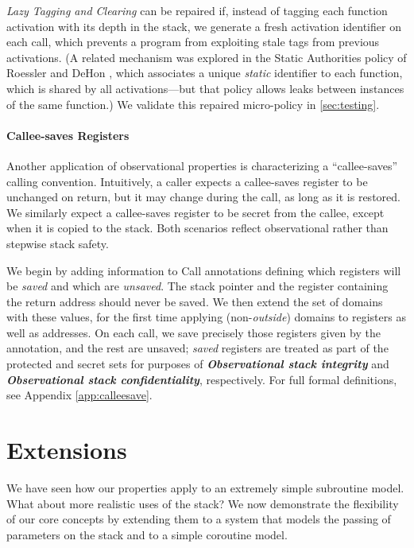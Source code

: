 \documentclass[10pt,conference]{ieeetran}%
\theoremstyle{definition}
\begin{document}
{{\em Lazy Tagging and Clearing} can be repaired if, instead of tagging each function
activation with its depth in the stack, we generate a fresh activation
identifier on each call, which prevents a program from exploiting stale
tags from previous activations.
(A related mechanism was explored in the
Static Authorities policy of Roessler and DeHon \cite{DBLP:conf/sp/RoesslerD18}, which
associates a unique \emph{static} identifier to each function, which is shared
by all activations---but that policy allows leaks between
instances of the same function.) We validate this repaired micro-policy in
\ref{sec:testing}.

\medskip
\paragraph*{Callee-saves Registers}
\label{sec:callee}

Another application of observational properties is characterizing a ``callee-saves''
calling convention. Intuitively, a caller expects a callee-saves register to be unchanged on
return, but it may change during the call, as long as it is restored. We similarly expect a callee-saves
register to be secret from the callee, except when it is copied to the stack. Both scenarios
reflect observational rather than stepwise stack safety.

We begin by adding information to Call annotations defining which registers will be {\em saved}
and which are {\em unsaved}. The stack pointer and the register containing the return address
should never be saved. We then extend the set of domains with these values, for the first time applying
(non-{\em outside}) domains to registers as well as addresses. On each call, we save precisely those
registers given by the annotation, and the rest are unsaved; {\em saved} registers are treated as part
of the protected and secret sets for purposes of \textbf{\em Observational stack integrity} and
\textbf{\em Observational stack confidentiality}, respectively. For full formal definitions, see
Appendix \ref{app:calleesave}.

\section{Extensions}
\label{sec:ext}

We have seen how our properties apply to an extremely simple
subroutine model.
What about more realistic uses of the stack? We now demonstrate the
flexibility of our core concepts by extending
them to a system that models the passing of
parameters on the stack and to a simple coroutine model.

}
\end{document}
